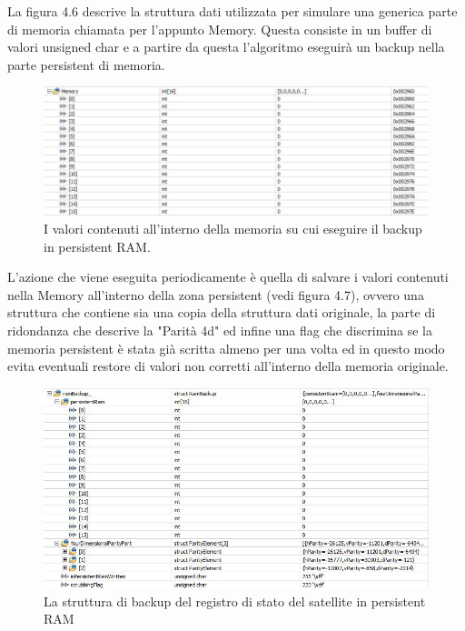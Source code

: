 \documentclass[LaM,binding=0.6cm,oneside]{../sapthesis}
\begin{document}
La figura 4.6 descrive la struttura dati utilizzata per simulare una generica parte di memoria chiamata per l'appunto Memory. Questa consiste in un buffer di valori unsigned char e a partire da questa l'algoritmo eseguirà un backup nella parte persistent di memoria.
\begin{figure}[htbp]
\centerline{\includegraphics[scale=0.6]{examples/1_MemoryNonCorrottaInizio.JPG}}
\caption{I valori contenuti all'interno della memoria su cui eseguire il backup in persistent RAM.}
\label{fig}
\end{figure}
\newline
L'azione che viene eseguita periodicamente è quella di salvare i valori contenuti nella Memory all'interno della zona persistent (vedi figura 4.7), ovvero una struttura che contiene sia una copia della struttura dati originale, la parte di ridondanza che descrive la "Parità 4d" ed infine una flag che discrimina se la memoria persistent è stata già scritta almeno per una volta ed in questo modo evita eventuali restore di valori non corretti all'interno della memoria originale.

\begin{figure}[htbp]
\centerline{\includegraphics[scale=0.6]{examples/2_PersistentRamBackup.JPG}}
\caption{La struttura di backup del registro di stato del satellite in persistent RAM}
\label{fig}
\end{figure}
\vspace{0.5cm}
\end{document}
